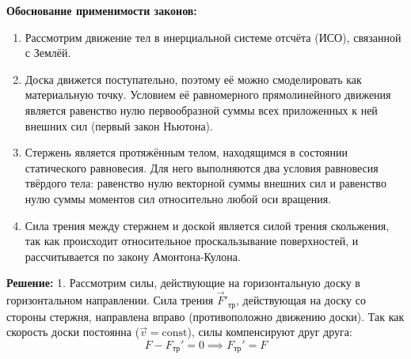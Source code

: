 \begin{taskadvanced}
\begin{center}
\end{center}

\begin{solutionbox}
\textbf{Обоснование применимости законов:}
\begin{enumerate}[leftmargin=*]
    \item Рассмотрим движение тел в инерциальной системе отсчёта (ИСО), связанной с Землёй.
    \item Доска движется поступательно, поэтому её можно смоделировать как материальную точку. Условием её равномерного прямолинейного движения является равенство нулю первообразной суммы всех приложенных к ней внешних сил (первый закон Ньютона).
    \item Стержень является протяжённым телом, находящимся в состоянии статического равновесия. Для него выполняются два условия равновесия твёрдого тела: равенство нулю векторной суммы внешних сил и равенство нулю суммы моментов сил относительно любой оси вращения.
    \item Сила трения между стержнем и доской является силой трения скольжения, так как происходит относительное проскальзывание поверхностей, и рассчитывается по закону Амонтона-Кулона.
\end{enumerate}

\textbf{Решение:}
1. Рассмотрим силы, действующие на горизонтальную доску в горизонтальном направлении. Сила трения $\vec{F}'_{\text{тр}}$, действующая на доску со стороны стержня, направлена вправо (противоположно движению доски). Так как скорость доски постоянна ($\vec{v} = \text{const}$), силы компенсируют друг друга:
$$F - F_{\text{тр}}' = 0 \implies F_{\text{тр}}' = F$$


\end{solutionbox}
\end{taskadvanced}
